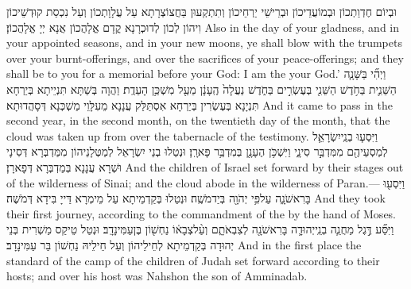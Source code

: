 {וּבְיוֹם חֶדְוַתְכוֹן וּבְמוֹעֲדֵיכוֹן וּבְרֵישֵׁי יַרְחֵיכוֹן וְתִתְקְעוּן בַּחֲצוֹצְרָתָא עַל עֲלָוָתְכוֹן וְעַל נִכְסַת קוּדְשֵׁיכוֹן וִיהוֹן לְכוֹן לְדוּכְרָנָא קֳדָם אֱלָהֲכוֹן אֲנָא יְיָ אֱלָהֲכוֹן׃}
{Also in the day of your gladness, and in your appointed seasons, and in your new moons, ye shall blow with the trumpets over your burnt-offerings, and over the sacrifices of your peace-offerings; and they shall be to you for a memorial before your God: I am the \lord\space your God.’}{}
{וַיְהִ֞י בַּשָּׁנָ֧ה הַשֵּׁנִ֛ית בַּחֹ֥דֶשׁ הַשֵּׁנִ֖י בְּעֶשְׂרִ֣ים בַּחֹ֑דֶשׁ נַעֲלָה֙ הֶֽעָנָ֔ן מֵעַ֖ל מִשְׁכַּ֥ן הָעֵדֻֽת׃}
{וַהֲוָה בְּשַׁתָּא תִּנְיֵיתָא בְּיַרְחָא תִּנְיָנָא בְּעֶשְׂרִין בְּיַרְחָא אִסְתַּלַּק עֲנָנָא מֵעִלָּוֵי מַשְׁכְּנָא דְּסָהֲדוּתָא׃}
{And it came to pass in the second year, in the second month, on the twentieth day of the month, that the cloud was taken up from over the tabernacle of the testimony.}{}
{וַיִּסְע֧וּ בְנֵֽי\maqqaf יִשְׂרָאֵ֛ל לְמַסְעֵיהֶ֖ם מִמִּדְבַּ֣ר סִינָ֑י וַיִּשְׁכֹּ֥ן הֶעָנָ֖ן בְּמִדְבַּ֥ר פָּארָֽן׃}
{וּנְטַלוּ בְנֵי יִשְׂרָאֵל לְמַטְּלָנֵיהוֹן מִמַּדְבְּרָא דְּסִינָי וּשְׁרָא עֲנָנָא בְּמַדְבְּרָא דְּפָארָן׃}
{And the children of Israel set forward by their stages out of the wilderness of Sinai; and the cloud abode in the wilderness of Paran.—}{}
{וַיִּסְע֖וּ בָּרִאשֹׁנָ֑ה עַל\maqqaf פִּ֥י יְהֹוָ֖ה בְּיַד\maqqaf מֹשֶֽׁה׃}
{וּנְטַלוּ בְּקַדְמֵיתָא עַל מֵימְרָא דַּייָ בִּידָא דְּמֹשֶׁה׃}
{And they took their first journey, according to the commandment of the \lord\space by the hand of Moses.}{}
{וַיִּסַּ֞ע דֶּ֣גֶל מַחֲנֵ֧ה בְנֵֽי\maqqaf יְהוּדָ֛ה בָּרִאשֹׁנָ֖ה לְצִבְאֹתָ֑ם וְעַ֨ל\maqqaf צְבָא֔וֹ נַחְשׁ֖וֹן בֶּן\maqqaf עַמִּינָדָֽב׃}
{וּנְטַל טֵיקַס מַשְׁרִית בְּנֵי יְהוּדָה בְּקַדְמֵיתָא לְחֵילֵיהוֹן וְעַל חֵילֵיהּ נַחְשׁוֹן בַּר עַמִּינָדָב׃}
{And in the first place the standard of the camp of the children of Judah set forward according to their hosts; and over his host was Nahshon the son of Amminadab.}{}

